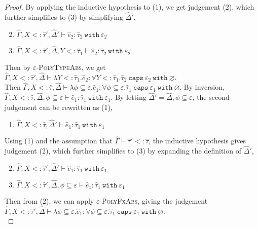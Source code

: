 \documentclass{llncs}
\newcommand{\keywadj}[1]{\mathtt{#1}}
\newcommand{\keyw}[1]{\keywadj{#1}~}
\newcommand{\kw}[1]{\keyw{ #1 }}
\begin{document}
\begin{proof}
By applying the inductive hypothesis to (1), we get judgement (2), which further simplifies to (3) by simplifying $\hat \Delta'$,

\begin{enumerate}
	\setcounter{enumi}{1}
	\item $\hat \Gamma, X <: \hat \tau', \hat \Delta' \vdash \hat e_2: \hat \tau_2~\kw{with} \varepsilon_2$
	\item $\hat \Gamma, X <: \hat \tau', \hat \Delta, Y <: \hat \tau_1 \vdash \hat e_2: \hat \tau_2~\kw{with} \varepsilon_2$
\end{enumerate}

Then by \textsc{$\varepsilon$-PolyTypeAbs}, we get $\hat \Gamma, X <: \hat \tau', \hat \Delta \vdash \lambda Y <: \hat \tau_1. \hat e_2: \forall Y <: \hat \tau_1. \hat \tau_2~\kw{caps} \varepsilon_2~\kw{with} \varnothing$.\\

 Then $\hat \Gamma, X <: \hat \tau, \hat \Delta \vdash \lambda \phi \subseteq \varepsilon. \hat e_1: \forall \phi \subseteq \varepsilon. \hat \tau_1~\kw{caps} \varepsilon_1~\kw{with} \varnothing$. By inversion, $\hat \Gamma, X <: \hat \tau, \hat \Delta, \phi \subseteq \varepsilon \vdash \hat e_1: \hat \tau_1~\kw{with} \varepsilon_1$. By letting $\hat \Delta' = \hat \Delta, \phi \subseteq \varepsilon$, the second judgement can be rewritten as (1),

\begin{enumerate}
	\item $\hat \Gamma, X <: \hat \tau, \hat \Delta' \vdash \hat e_1: \hat \tau_1~\kw{with} \varepsilon_1$
\end{enumerate}

Using (1) and the assumption that $\hat \Gamma \vdash \hat \tau' <: \hat \tau$, the inductive hypothesis gives judgement (2), which further simplifies to (3) by expanding the definition of $\hat \Delta'$,

\begin{enumerate}
	\setcounter{enumi}{1}
	\item $\hat \Gamma, X <: \hat \tau', \hat \Delta' \vdash \hat e_1: \hat \tau_1~\kw{with} \varepsilon_1$
	\item $\hat \Gamma, X <: \hat \tau', \hat \Delta, \phi \subseteq \varepsilon \vdash \hat e_1: \hat \tau_1~\kw{with} \varepsilon_1$
\end{enumerate}

Then from (2), we can apply \textsc{$\varepsilon$-PolyFxAbs}, giving the judgement $\hat \Gamma, X <: \hat \tau', \hat \Delta \vdash \lambda \phi \subseteq \varepsilon. \hat e_1: \forall \phi \subseteq \varepsilon. \hat \tau_1~\kw{caps} \varepsilon_1~\kw{with} \varnothing$. \\


\end{proof}
\end{document}
